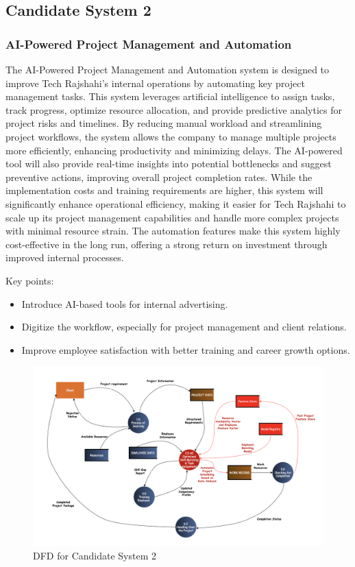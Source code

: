 \documentclass[12pt,a4paper]{article}
\begin{document}
\newpage
\subsection*{Candidate System 2}
\subsubsection*{AI-Powered Project Management and Automation}
The AI-Powered Project Management and Automation system is designed to improve Tech Rajshahi’s internal operations by automating key project management tasks.  This system leverages artificial intelligence to assign tasks, track progress, optimize resource allocation, and provide predictive analytics for project risks and timelines.  By reducing manual workload and streamlining project workflows, the system allows the company to manage multiple projects more efficiently, enhancing productivity and minimizing delays.  The AI-powered tool will also provide real-time insights into potential bottlenecks and suggest preventive actions, improving overall project completion rates.  While the implementation costs and training requirements are higher, this system will significantly enhance operational efficiency, making it easier for Tech Rajshahi to scale up its project management capabilities and handle more complex projects with minimal resource strain.  The automation features make this system highly cost-effective in the long run, offering a strong return on investment through improved internal processes.

Key points:
\begin{itemize}
    \item Introduce AI-based tools for internal advertising.
    \item Digitize the workflow, especially for project management and client relations.
    \item Improve employee satisfaction with better training and career growth options.
\end{itemize}

\begin{figure}[H]
    \centering
    \includegraphics[width=\textwidth]{Fig/dfd_candidate_system2.png}
    \caption{DFD for Candidate System 2}
    \label{fig:dfd_candidate_system2}
\end{figure}
\end{document}
